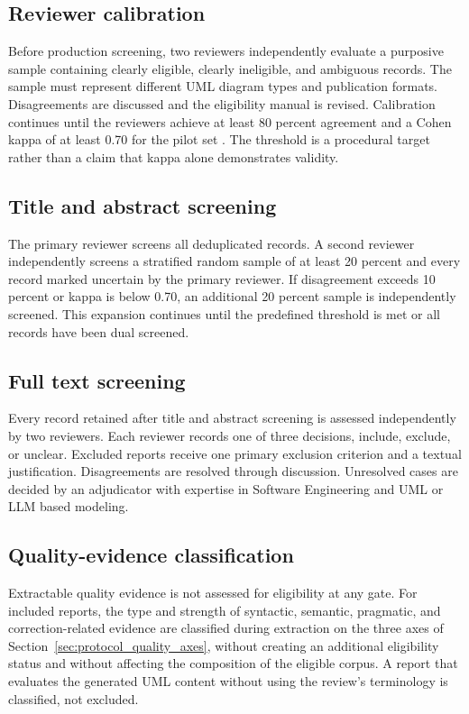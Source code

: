 \subsection{Reviewer calibration}

Before production screening, two reviewers independently evaluate a purposive sample containing clearly eligible, clearly ineligible, and ambiguous records. The sample must represent different UML diagram types and publication formats. Disagreements are discussed and the eligibility manual is revised. Calibration continues until the reviewers achieve at least 80 percent agreement and a Cohen kappa of at least 0.70 for the pilot set \cite{Cohen1960Kappa}. The threshold is a procedural target rather than a claim that kappa alone demonstrates validity.

\subsection{Title and abstract screening}

The primary reviewer screens all deduplicated records. A second reviewer independently screens a stratified random sample of at least 20 percent and every record marked uncertain by the primary reviewer. If disagreement exceeds 10 percent or kappa is below 0.70, an additional 20 percent sample is independently screened. This expansion continues until the predefined threshold is met or all records have been dual screened.

\subsection{Full text screening}

Every record retained after title and abstract screening is assessed independently by two reviewers. Each reviewer records one of three decisions, include, exclude, or unclear. Excluded reports receive one primary exclusion criterion and a textual justification. Disagreements are resolved through discussion. Unresolved cases are decided by an adjudicator with expertise in Software Engineering and UML or LLM based modeling.

\subsection{Quality-evidence classification}

Extractable quality evidence is not assessed for eligibility at any gate. For included reports, the type and strength of syntactic, semantic, pragmatic, and correction-related evidence are classified during extraction on the three axes of Section~\ref{sec:protocol_quality_axes}, without creating an additional eligibility status and without affecting the composition of the eligible corpus. A report that evaluates the generated UML content without using the review's terminology is classified, not excluded.

